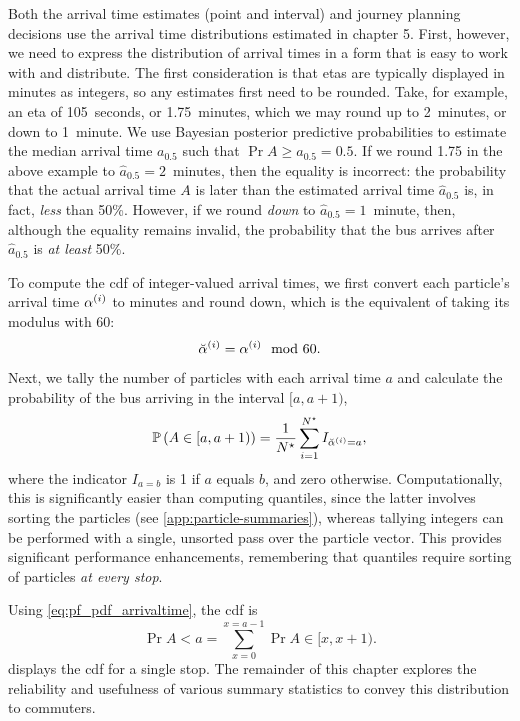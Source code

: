 Both the arrival time estimates (point and interval) and journey planning decisions use the arrival time distributions estimated in chapter 5. First, however, we need to express the distribution of arrival times in a form that is easy to work with and distribute. The first consideration is that \glspl{eta} are typically displayed in minutes as integers, so any estimates first need to be rounded. Take, for example, an \gls{eta} of 105~seconds, or 1.75~minutes, which we may round up to 2~minutes, or down to 1~minute. We use Bayesian posterior predictive probabilities to estimate the median arrival time $a_{0.5}$ such that $\Pr{A \geq a_{0.5}} = 0.5$. If we round 1.75 in the above example to $\hat a_{0.5} = 2$~minutes, then the equality is incorrect: the probability that the actual arrival time $A$ is later than the estimated arrival time $\hat a_{0.5}$ is, in fact, \emph{less} than 50\%. However, if we round \emph{down} to $\hat a_{0.5} = 1$~minute, then, although the equality remains invalid, the probability that the bus arrives after $\hat a_{0.5}$ is \emph{at least} 50\%.


To compute the \gls{cdf} of integer-valued arrival times, we first convert each particle's arrival time $\alpha^{(i)}$ to minutes and round down, which is the equivalent of taking its modulus with 60:
\begin{equation}
\label{eq:particle_eta_modulus}
\breve{\alpha}^{(i)} = \alpha^{(i)} \mod 60.
\end{equation}
Next, we tally the number of particles with each arrival time $a$ and calculate the probability of the bus arriving in the interval $[a, a+1)$,
\begin{equation}
\label{eq:pf_pdf_arrivaltime}
\mathbb{P}\left(A \in [a, a+1)\right) =
\frac{1}{N^\star} \sum_{i=1}^{N^\star} I_{\breve{\alpha}^{(i)} = a},
\end{equation}
where the indicator $I_{a=b}$ is 1 if $a$ equals $b$, and zero otherwise. Computationally, this is significantly easier than computing quantiles, since the latter involves sorting the particles (see \cref{app:particle-summaries}), whereas tallying integers can be performed with a single, unsorted pass over the particle vector. This provides significant performance enhancements, remembering that quantiles require sorting of particles \emph{at every stop}.


Using \cref{eq:pf_pdf_arrivaltime}, the \gls{cdf} is
\begin{equation}
\label{eq:pf_cdf_arrivaltime}
\Pr{A < a} = \sum_{x=0}^{x=a-1} \Pr{A \in [x, x+1)}.
\end{equation}
 displays the \gls{cdf} for a single stop. The remainder of this chapter explores the reliability and usefulness of various summary statistics to convey this distribution to commuters.


